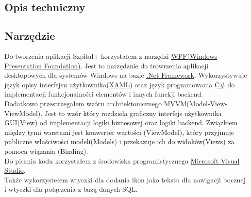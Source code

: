 \begin{flushleft}
\section{\LARGE{Opis techniczny}}
\end{flushleft}

\begin{flushleft}
    \subsection{\Large{Narzędzie}}
    \hspace{5mm}Do tworzenia aplikacji \textquotedbl Szpital+\textquotedbl{} korzystałem z narzędzi {\color{blue}\href{https://pl.wikipedia.org/wiki/Windows_Presentation_Foundation}{WPF(Windows Presentation Foundation)}}. Jest to narzędznie do trowrzenia aplikacji desktopowych dla systemów Windows na bazie {\color{blue}\href{https://pl.wikipedia.org/wiki/.NET_Framework}{.Net Framework}}. Wykorzystywuje język opisy interfejsu użytkownika({\color{blue}\href{https://pl.wikipedia.org/wiki/Extensible_Application_Markup_Language}{XAML}}\label{href:XAML}) oraz język programowania {\color{blue}\href{https://pl.wikipedia.org/wiki/C_Sharp}{C\#}}\label{href:c_sh} do implementacji funkcjonalności elementów i innych funckji backend.
    \\
    \hspace{5mm} Dodatkowo przestrzegałem {\color{blue}\href{https://en.wikipedia.org/wiki/Model%E2%80%93view%E2%80%93viewmodel}{wzóru architektonicznego MVVM}}(Model-View-ViewModel)\label{href:MVVM}. Jest to wzór który rozdziela graficzny interfejs użytkownika GUI(View) od implementacji logiki biznesowej oraz logiki backend. Związkiem między tymi warstami jest konwerter wartości (ViewModel), który przyjmuje publiczne właściwości modeli(Models) i przekazuje ich do widoków(Views) za pomocą wiązania (Binding).
    \\
    \hspace{5mm} Do pisania kodu korzystałem z środowiska programistycznego {\color{blue}\href{https://pl.wikipedia.org/wiki/Microsoft_Visual_Studio}{Microsoft Visual Studio}\label{href:VStudio}}.
    \\
    \hspace{5mm}Także wykorzystełem wtyczki \textquotedbl{} dla dodania ikon jako tekstu dla nawigacji bocznej i wtyczki \textquotedbl{} dla połączenia z bazą danych SQL.
\end{flushleft}

